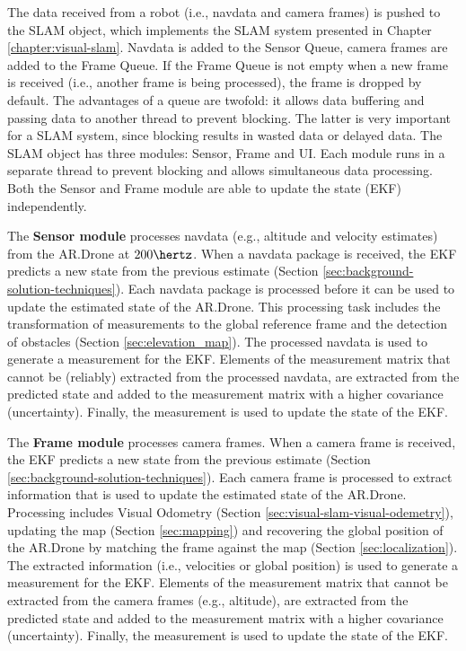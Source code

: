 The data received from a robot (i.e., navdata and camera frames) is pushed to the SLAM object, which implements the SLAM system presented in Chapter \ref{chapter:visual-slam}.
Navdata is added to the Sensor Queue, camera frames are added to the Frame Queue.
If the Frame Queue is not empty when a new frame is received (i.e., another frame is being processed), the frame is dropped by default.
The advantages of a queue are twofold: it allows data buffering and passing data to another thread to prevent blocking.
The latter is very important for a SLAM system, since blocking results in wasted data or delayed data.
The SLAM object has three modules: Sensor, Frame and UI.
Each module runs in a separate thread to prevent blocking and allows simultaneous data processing.
Both the Sensor and Frame module are able to update the state (EKF) independently.

The \textbf{Sensor module} processes navdata (e.g., altitude and velocity estimates) from the AR.Drone at $200\hertz$.
When a navdata package is received, the EKF predicts a new state from the previous estimate (Section \ref{sec:background-solution-techniques}).
Each navdata package is processed before it can be used to update the estimated state of the AR.Drone.
This processing task includes the transformation of measurements to the global reference frame and the detection of obstacles (Section \ref{sec:elevation_map}).
The processed navdata is used to generate a measurement for the EKF.
Elements of the measurement matrix that cannot be (reliably) extracted from the processed navdata, are extracted from the predicted state and added to the measurement matrix with a higher covariance (uncertainty).
Finally, the measurement is used to update the state of the EKF.

The \textbf{Frame module} processes camera frames.
When a camera frame is received, the EKF predicts a new state from the previous estimate (Section \ref{sec:background-solution-techniques}).
Each camera frame is processed to extract information that is used to update the estimated state of the AR.Drone.
Processing includes Visual Odometry (Section \ref{sec:visual-slam-visual-odemetry}), updating the map (Section \ref{sec:mapping}) and recovering the global position of the AR.Drone by matching the frame against the map (Section \ref{sec:localization}).
The extracted information (i.e., velocities or global position) is used to generate a measurement for the EKF.
Elements of the measurement matrix that cannot be extracted from the camera frames (e.g., altitude), are extracted from the predicted state and added to the measurement matrix with a higher covariance (uncertainty).
Finally, the measurement is used to update the state of the EKF.

